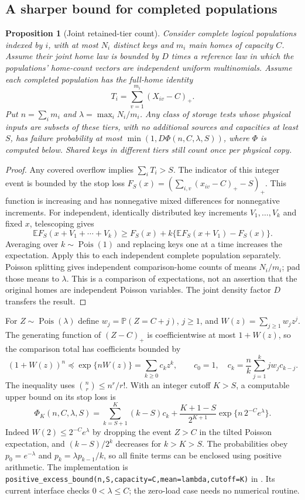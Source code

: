 \documentclass[11pt]{article}
\newtheorem{proposition}[theorem]{Proposition}
\theoremstyle{definition}
\theoremstyle{remark}
\newcommand{\E}{\mathbb E}
\newcommand{\Prb}{\mathbb P}
\newcommand{\Pois}{\operatorname{Pois}}
\begin{document}
\subsection{A sharper bound for completed populations}
\label{sec:positive-series}
\begin{proposition}[Joint retained-tier count]\label{prop:general-tiers}
Consider complete logical populations indexed by $i$, with at most $N_i$
distinct keys and $m_i$ main homes of capacity $C$. Assume their joint
home law is bounded by $D$ times a reference law in which the populations'
home-count vectors are independent uniform multinomials. Assume each
completed population has the full-home identity
\[
 T_i=\sum_{v=1}^{m_i}(X_{iv}-C)_+.
\]
Put $n=\sum_i m_i$ and $\lambda=\max_i N_i/m_i$. Any class of storage tests
whose physical inputs are subsets of these tiers, with no additional
sources and capacities at least $S$, has failure probability at most
$\min(1,D\Phi(n,C,\lambda,S))$, where $\Phi$ is computed below.
Shared keys in different tiers still count once per physical copy.
\end{proposition}
\begin{proof}
Any covered overflow implies $\sum_iT_i>S$. The indicator of this integer
event is bounded by the stop loss
$F_S(x)=(\sum_{i,v}(x_{iv}-C)_+-S)_+$.
This function is increasing and has nonnegative mixed differences for
nonnegative increments. For independent, identically distributed key
increments $V_1,\ldots,V_k$ and fixed $x$, telescoping gives
\[
 \E F_S(x+V_1+\cdots+V_k)
 \ge F_S(x)+k\{\E F_S(x+V_1)-F_S(x)\}.
\]
Averaging over $k\sim\Pois(1)$ and replacing keys one at a time increases
the expectation. Apply this to each independent complete population
separately. Poisson splitting gives independent comparison-home counts of
means $N_i/m_i$; pad those means to $\lambda$. This is a comparison of
expectations, not an assertion that the original homes are independent
Poisson variables. The joint density factor $D$ transfers the result.
\end{proof}

For $Z\sim\Pois(\lambda)$ define $w_j=\Prb(Z=C+j)$, $j\ge1$, and
$W(z)=\sum_{j\ge1}w_jz^j$. The generating function of $(Z-C)_+$ is
coefficientwise at most $1+W(z)$, so the comparison total has coefficients
bounded by
\[
 (1+W(z))^n\preceq\exp\{nW(z)\}=\sum_{k\ge0}c_kz^k,
 \qquad c_0=1,\quad c_k=\frac nk\sum_{j=1}^k j w_jc_{k-j}.
\]
The inequality uses $\binom nr\le n^r/r!$. With an integer cutoff $K>S$,
a computable upper bound on its stop loss is
\begin{equation}\label{eq:general-series}
 \Phi_K(n,C,\lambda,S)
 =\sum_{k=S+1}^K(k-S)c_k
 +\frac{K+1-S}{2^{K+1}}
       \exp\{n\,2^{-C}e^\lambda\}.
\end{equation}
Indeed $W(2)\le2^{-C}e^\lambda$ by dropping the event $Z>C$ in the
tilted Poisson expectation, and $(k-S)/2^k$ decreases for $k>K>S$.
The probabilities obey $p_0=e^{-\lambda}$ and
$p_k=\lambda p_{k-1}/k$, so all finite terms can be enclosed using positive
arithmetic. The implementation is
\texttt{positive\_excess\_bound(n,S,capacity=C,mean=lambda,cutoff=K)} in
. Its current interface checks
$0<\lambda\le C$; the zero-load case needs no numerical routine.
\end{document}
